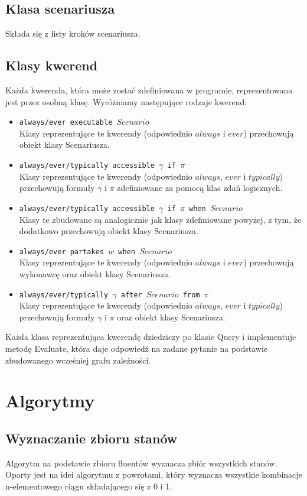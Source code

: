 \documentclass{article}
\begin{document}
\subsection{Klasa scenariusza}
Składa się z listy kroków scenariusza.

\subsection{Klasy kwerend}
Każda kwerenda, która może zostać zdefiniowana w programie, reprezentowana jest przez osobną klasę. Wyróżniamy następujące rodzaje kwerend:
\begin{itemize}
\item {\large\texttt{always/ever executable $Scenario$}} \\
Klasy reprezentujące te kwerendy (odpowiednio $always$ i $ever$) przechowują obiekt klasy Scenariusza.
\item {\large\texttt{always/ever/typically accessible $\gamma$ if $\pi$}}\\
Klasy reprezentujące te kwerendy (odpowiednio $always$, $ever$ i $typically$) przechowują formuły $\gamma$ i $\pi$ zdefiniowane za pomocą klas zdań logicznych.
\item {\large\texttt{always/ever/typically accessible $\gamma$ if $\pi$ when $Scenario$}}\\
Klasy te zbudowane są analogicznie jak klasy zdefiniowane powyżej, z tym, że dodatkowo przechowują obiekt klasy Scenariusza.
\item {\large\texttt{always/ever partakes $w$ when $Scenario$}}\\
Klasy reprezentujące te kwerendy (odpowiednio $always$ i $ever$) przechowują wykonawcę oraz obiekt klasy Scenariusza.
\item {\large\texttt{always/ever/typically $\gamma$ after $Scenario$ from $\pi$}} \\
Klasy reprezentujące te kwerendy (odpowiednio $always$, $ever$ i $typically$) przechowują formuły $\gamma$ i $\pi$ oraz obiekt klasy Scenariusza.
\end{itemize}
Każda klasa reprezentująca kwerendę dziedziczy po klasie Query i implementuje metodę Evaluate, która daje odpowiedź na zadane pytanie na podstawie zbudowanego wcześniej grafu zależności.
\newpage

\section{Algorytmy}

\subsection{Wyznaczanie zbioru stanów}
Algorytm na podstawie zbioru fluentów wyznacza zbiór wszystkich stanów. Oparty jest na idei algorytmu z powrotami, który wyznacza wszystkie kombinacje n-elementowego ciągu składającego się z 0 i 1.
\end{document}
